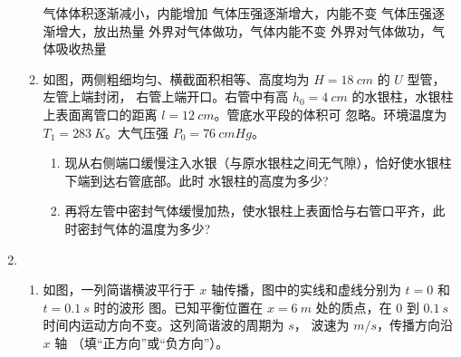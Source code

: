 \begin{enumerate}
\begin{enumerate}
\fivechoices
{气体体积逐渐减小，内能增加}
{气体压强逐渐增大，内能不变}
{气体压强逐渐增大，放出热量}
{外界对气体做功，气体内能不变}
{外界对气体做功，气体吸收热量}






\item 
如图，两侧粗细均匀、横截面积相等、高度均为 $ H=18 \ cm $ 的 $ U $ 型管，左管上端封闭，
右管上端开口。右管中有高 $ h_{0} =4 \ cm $ 的水银柱，水银柱上表面离管口的距离 $ l=12 \ cm $。管底水平段的体积可
忽略。环境温度为 $ T_{1} =283 \ K $。大气压强 $ P_0=76 \ cmHg $。
\begin{enumerate}
\item
现从右侧端口缓慢注入水银（与原水银柱之间无气隙），恰好使水银柱下端到达右管底部。此时
水银柱的高度为多少?
\item 
再将左管中密封气体缓慢加热，使水银柱上表面恰与右管口平齐，此时密封气体的温度为多少?
\end{enumerate}
\begin{figure}[h!]
\flushright

\end{figure}








\end{enumerate}


\newpage




\item 
\begin{enumerate}
\item
如图，一列简谐横波平行于 $ x $ 轴传播，图中的实线和虚线分别为 $ t=0 $ 和 $ t=0.1 \ s $ 时的波形
图。已知平衡位置在 $ x=6 \ m $ 处的质点，在 $ 0 $ 到 $ 0.1 \ s $ 时间内运动方向不变。这列简谐波的周期为 \underlinegap $ s $，
波速为 \underlinegap $ m/s $，传播方向沿 $ x $ 轴 \underlinegap （填“正方向”或“负方向”）。
\begin{figure}[h!]
\centering

\end{figure}



\end{enumerate}
\end{enumerate}
